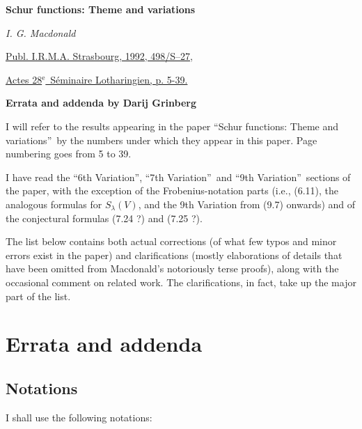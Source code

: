 \documentclass[numbers=enddot,12pt,final,onecolumn,notitlepage]{scrartcl}%
\theoremstyle{definition}
\begin{document}
\begin{center}
\textbf{Schur functions: Theme and variations}

\textit{I. G. Macdonald}

\href{https://www.mat.univie.ac.at/~slc/opapers/s28macdonald.html}{Publ.
I.R.M.A. Strasbourg, 1992, 498/S--27,}

\href{https://www.mat.univie.ac.at/~slc/opapers/s28macdonald.html}{Actes
28$^{\text{e}}$\ S\'{e}minaire Lotharingien, p. 5-39.}

\textbf{Errata and addenda by Darij Grinberg}

\bigskip
\end{center}

I will refer to the results appearing in the paper \textquotedblleft Schur
functions: Theme and variations\textquotedblright\ by the numbers under which
they appear in this paper. Page numbering goes from 5 to 39.

I have read the \textquotedblleft6th Variation\textquotedblright,
\textquotedblleft7th Variation\textquotedblright\ and \textquotedblleft9th
Variation\textquotedblright\ sections of the paper, with the exception of the
Frobenius-notation parts (i.e., (6.11), the analogous formulas for
$S_{\lambda}\left(  V\right)  $, and the 9th Variation from (9.7) onwards) and
of the conjectural formulas (7.24 ?) and (7.25 ?).

The list below contains both actual corrections (of what few typos and minor
errors exist in the paper) and clarifications (mostly elaborations of details
that have been omitted from Macdonald's notoriously terse proofs), along with
the occasional comment on related work. The clarifications, in fact, take up
the major part of the list.

\appendix \setcounter{section}{1}

\section{Errata and addenda}

\subsection{Notations}

I shall use the following notations:
\end{document}

